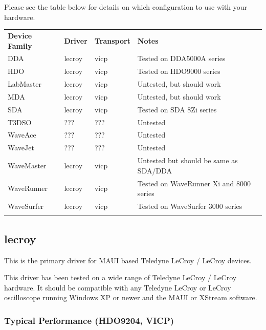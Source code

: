Please see the table below for details on which configuration to use with  your hardware.

\begin{tabularx}{16cm}{lllX}
\thickhline
\textbf{Device Family} & \textbf{Driver} & \textbf{Transport} & \textbf{Notes} \\
\thickhline
DDA & lecroy & vicp & Tested on DDA5000A series \\
\thickhline
HDO & lecroy & vicp & Tested on HDO9000 series \\
\thickhline
LabMaster & lecroy & vicp & Untested, but should work\\
\thickhline
MDA & lecroy & vicp & Untested, but should work\\
\thickhline
SDA & lecroy & vicp & Tested on SDA 8Zi series\\
\thickhline
T3DSO & ??? & ??? & Untested\\
\thickhline
WaveAce & ??? & ??? & Untested\\
\thickhline
WaveJet & ??? & ??? & Untested\\
\thickhline
WaveMaster & lecroy & vicp & Untested but should be same as SDA/DDA\\
\thickhline
WaveRunner & lecroy & vicp & Tested on WaveRunner Xi and 8000 series\\
\thickhline
WaveSurfer & lecroy & vicp & Tested on WaveSurfer 3000 series \\
\thickhline
\end{tabularx}

\subsection{lecroy}

This is the primary driver for MAUI based Teledyne LeCroy / LeCroy devices.

This driver has been tested on a wide range of Teledyne LeCroy / LeCroy hardware. It should be compatible with any
Teledyne LeCroy or LeCroy oscilloscope running Windows XP or newer and the MAUI or XStream software.

\subsubsection{Typical Performance (HDO9204, VICP)}

